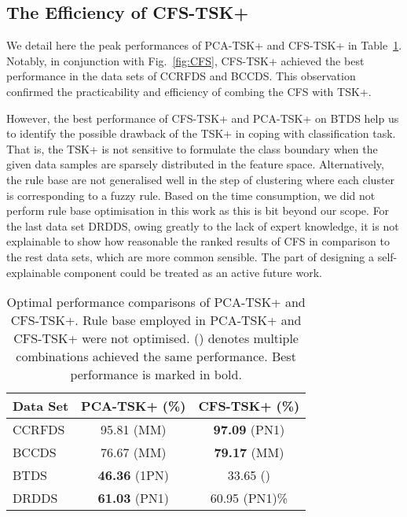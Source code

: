 \documentclass{article}
\newcommand*{\1}{\textcolor{red}}
\begin{document}
\subsection{The Efficiency of CFS-TSK+}
We detail here the peak performances of PCA-TSK+ and CFS-TSK+ in Table~\ref{tbl:csktsk+}. Notably, in conjunction with Fig.~\ref{fig:CFS}, CFS-TSK+ achieved the best performance in the data sets of CCRFDS and BCCDS. This observation confirmed the practicability and efficiency of combing the CFS with TSK+. 

However, the best performance of CFS-TSK+ and PCA-TSK+ on BTDS help us to identify the possible drawback of the TSK+ in coping with classification task. That is, the TSK+ is not sensitive to formulate the class boundary when the given data samples are sparsely distributed in the feature space. Alternatively, the rule base are not generalised well in the step of clustering where each cluster is corresponding to a fuzzy rule. Based on the time consumption, we did not perform rule base optimisation in this work as this is bit beyond our scope. For the last data set DRDDS, owing greatly to the lack of expert knowledge, it is not explainable to show how reasonable the ranked results of CFS in comparison to the rest data sets, which are more common sensible. The part of designing a self-explainable component could be treated as an active future work.

\begin{table}[]
	\centering
	\caption{Optimal performance comparisons of PCA-TSK+ and CFS-TSK+. Rule base employed in PCA-TSK+ and CFS-TSK+ were not optimised. () denotes multiple combinations achieved the same performance. Best performance is marked in bold.}
	\begin{tabular}{l|c|c}
		\hline
		Data Set
		& PCA-TSK+ (\%) & CFS-TSK+ (\%)\\
		\hline
		\hline
		CCRFDS & 95.81 (MM) & \textbf{97.09} (PN1)\\ 
		\hline
		BCCDS & 76.67 (MM) & \textbf{79.17} (MM)\\ 
		\hline
		BTDS & \textbf{46.36} (1PN) & 33.65 ()\\ 
		\hline
		DRDDS & \textbf{61.03} (PN1) & 60.95 (PN1)\%\\ 
		\hline
	\end{tabular}
	\label{tbl:csktsk+}
\end{table}
\end{document}
